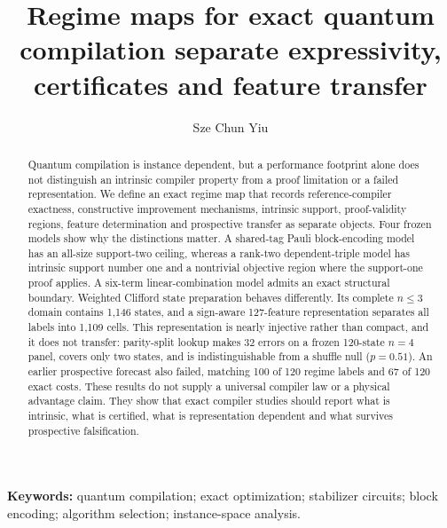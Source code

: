 \documentclass[a4paper,twocolumn,11pt,unpublished]{quantumarticle}
\theoremstyle{definition}
\begin{document}
\title{Regime maps for exact quantum compilation separate expressivity, certificates and feature transfer}
\author{Sze Chun Yiu}
\maketitle

\begin{abstract}
Quantum compilation is instance dependent, but a performance footprint alone does not distinguish an intrinsic compiler property from a proof limitation or a failed representation.  We define an exact regime map that records reference-compiler exactness, constructive improvement mechanisms, intrinsic support, proof-validity regions, feature determination and prospective transfer as separate objects.  Four frozen models show why the distinctions matter.  A shared-tag Pauli block-encoding model has an all-size support-two ceiling, whereas a rank-two dependent-triple model has intrinsic support number one and a nontrivial objective region where the support-one proof applies.  A six-term linear-combination model admits an exact structural boundary.  Weighted Clifford state preparation behaves differently.  Its complete $n\leq3$ domain contains 1,146 states, and a sign-aware 127-feature representation separates all labels into 1,109 cells.  This representation is nearly injective rather than compact, and it does not transfer: parity-split lookup makes 32 errors on a frozen 120-state $n=4$ panel, covers only two states, and is indistinguishable from a shuffle null ($p=0.51$).  An earlier prospective forecast also failed, matching 100 of 120 regime labels and 67 of 120 exact costs.  These results do not supply a universal compiler law or a physical advantage claim.  They show that exact compiler studies should report what is intrinsic, what is certified, what is representation dependent and what survives prospective falsification.
\end{abstract}

\noindent\textbf{Keywords:} quantum compilation; exact optimization; stabilizer circuits; block encoding; algorithm selection; instance-space analysis.












\balance


\end{document}
